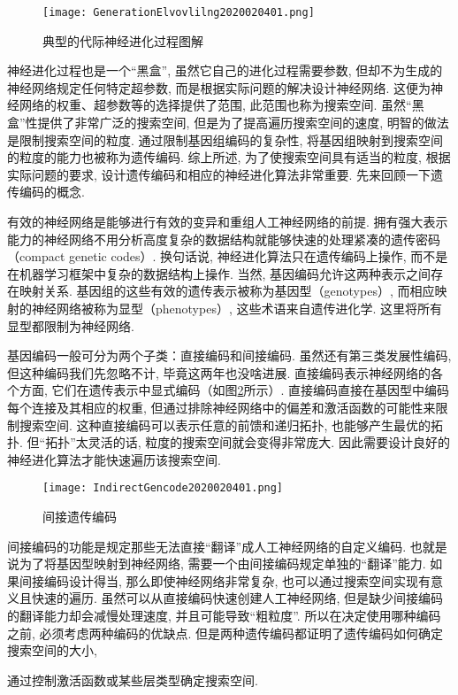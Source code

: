 {\begin{remark}
\begin{figure}[H]
\centering
\texttt{[image: GenerationElvovlilng2020020401.png]}
\caption{典型的代际神经进化过程图解}
\label{GenerationElvovlilng2020020401}
\end{figure}
\end{remark}
\begin{remark}
神经进化过程也是一个“黑盒”, 虽然它自己的进化过程需要参数, 但却不为生成的神经网络规定任何特定超参数, 而是根据实际问题的解决设计神经网络. 这便为神经网络的权重、超参数等的选择提供了范围, 此范围也称为搜索空间. 虽然“黑盒”性提供了非常广泛的搜索空间, 但是为了提高遍历搜索空间的速度, 明智的做法是限制搜索空间的粒度. 通过限制基因组编码的复杂性, 将基因组映射到搜索空间的粒度的能力也被称为遗传编码. 综上所述, 为了使搜索空间具有适当的粒度, 根据实际问题的要求, 设计遗传编码和相应的神经进化算法非常重要. 先来回顾一下遗传编码的概念.

有效的神经网络是能够进行有效的变异和重组人工神经网络的前提. 拥有强大表示能力的神经网络不用分析高度复杂的数据结构就能够快速的处理紧凑的遗传密码（compact genetic codes）.
换句话说, 神经进化算法只在遗传编码上操作, 而不是在机器学习框架中复杂的数据结构上操作. 当然, 基因编码允许这两种表示之间存在映射关系. 基因组的这些有效的遗传表示被称为基因型（genotypes）, 而相应映射的神经网络被称为显型（phenotypes）, 这些术语来自遗传进化学. 这里将所有显型都限制为神经网络.

基因编码一般可分为两个子类：直接编码和间接编码. 虽然还有第三类发展性编码, 但这种编码我们先忽略不计, 毕竟这两年也没啥进展. 直接编码表示神经网络的各个方面, 它们在遗传表示中显式编码（如图\ref{IndirectGencode2020020401}所示）. 直接编码直接在基因型中编码每个连接及其相应的权重, 但通过排除神经网络中的偏差和激活函数的可能性来限制搜索空间.
这种直接编码可以表示任意的前馈和递归拓扑, 也能够产生最优的拓扑. 但“拓扑”太灵活的话, 粒度的搜索空间就会变得非常庞大. 因此需要设计良好的神经进化算法才能快速遍历该搜索空间.
\begin{figure}[H]
\centering
\texttt{[image: IndirectGencode2020020401.png]}
\caption{间接遗传编码}
\label{IndirectGencode2020020401}
\end{figure}

间接编码的功能是规定那些无法直接“翻译”成人工神经网络的自定义编码. 也就是说为了将基因型映射到神经网络, 需要一个由间接编码规定单独的“翻译”能力. 如果间接编码设计得当, 那么即使神经网络非常复杂, 也可以通过搜索空间实现有意义且快速的遍历.
虽然可以从直接编码快速创建人工神经网络, 但是缺少间接编码的翻译能力却会减慢处理速度, 并且可能导致“粗粒度”. 所以在决定使用哪种编码之前, 必须考虑两种编码的优缺点.
但是两种遗传编码都证明了遗传编码如何确定搜索空间的大小,
\begin{example}
  通过控制激活函数或某些层类型确定搜索空间.
\end{example}
\end{remark}

}
